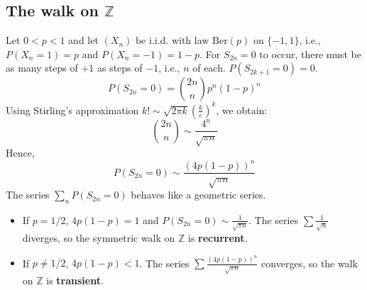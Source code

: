 \subsection{The walk on $\mathbb{Z}$}%
Let $0<p<1$ and let $(X_n)$ be i.i.d. with law $\text{Ber}(p)$ on $\{-1, 1\}$, i.e., $P(X_n=1)=p$ and $P(X_n=-1)=1-p$.
For $S_{2n}=0$ to occur, there must be as many steps of $+1$ as steps of $-1$, i.e., $n$ of each. $P(S_{2k+1}=0)=0$.%
\begin{equation*}
    P(S_{2n}=0) = \binom{2n}{n} p^n (1-p)^n
\end{equation*}%
Using Stirling's approximation $k! \sim \sqrt{2\pi k} (\frac{k}{e})^k$, we obtain:%
\begin{equation*}
    \binom{2n}{n} \sim \frac{4^n}{\sqrt{\pi n}}
\end{equation*}%
Hence,%
\begin{equation*}
    P(S_{2n}=0) \sim \frac{(4p(1-p))^n}{\sqrt{\pi n}}
\end{equation*}%
The series $\sum_n P(S_{2n}=0)$ behaves like a geometric series.%
\begin{itemize}
    \item If $p=1/2$, $4p(1-p)=1$ and $P(S_{2n}=0) \sim \frac{1}{\sqrt{\pi n}}$. The series $\sum \frac{1}{\sqrt{n}}$ diverges, so the symmetric walk on $\mathbb{Z}$ is \textbf{recurrent}.
\item If $p \neq 1/2$, $4p(1-p)<1$. The series $\sum \frac{(4p(1-p))^n}{\sqrt{\pi n}}$ converges, so the walk on $\mathbb{Z}$ is \textbf{transient}.
\end{itemize}%
